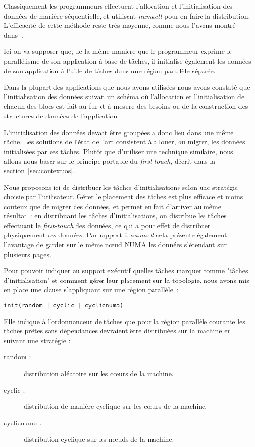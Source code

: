 Classiquement les programmeurs effectuent l'allocation et l'initialisation des données de manière séquentielle, et utilisent \emph{numactl} pour en faire la distribution. L'efficacité de cette méthode reste très moyenne, comme nous l'avons montré dans~\cite{Virouleau2016a}.

Ici on va supposer que, de la même manière que le programmeur exprime le parallélisme de son application à base de tâches, il initialise également les données de son application à l'aide de tâches dans une région parallèle séparée.

Dans la plupart des applications que nous avons utilisées nous avons constaté que l'initialisation des données suivait un schéma où l'allocation et l'initialisation de chacun des blocs est fait au fur et à mesure des besoins ou de la construction des structures de données de l'application.

L'initialisation des données devant être groupées a donc lieu dans une même tâche.
Les solutions de l'état de l'art consistent à allouer, ou migrer, les données initialisées par ces tâches.
Plutôt que d'utiliser une technique similaire, nous allons nous baser sur le principe portable du \emph{first-touch}, décrit dans la section~\ref{sec:context:os}.

Nous proposons ici de distribuer les tâches d'initialisations selon une stratégie choisie par l'utilisateur.
Gérer le placement des tâches est plus efficace et moins couteux que de migrer des données, et permet en fait d'arriver au même résultat~: en distribuant les tâches d'initialisations, on distribue les tâches effectuant le \emph{first-touch} des données, ce qui a pour effet de distribuer physiquement ces données.
Par rapport à \emph{numactl} cela présente également l'avantage de garder sur le même nœud NUMA les données s'étendant sur plusieurs pages.


Pour pouvoir indiquer au support exécutif quelles tâches marquer comme "tâches d'initialisation" et comment gérer leur placement sur la topologie, nous avons mis en place une clause s'appliquant sur une région parallèle~:

\begin{lstlisting}
init(random | cyclic | cyclicnuma)
\end{lstlisting}

Elle indique à l'ordonnanceur de tâches que pour la région parallèle courante les tâches prêtes sans dépendances devraient être distribuées sur la machine en suivant une stratégie :

\begin{description}
  \item [random :]
    distribution aléatoire sur les cœurs de la machine.
  \item [cyclic :]
    distribution de manière cyclique sur les cœurs de la machine.
  \item [cyclicnuma :]
    distribution cyclique sur les nœuds de la machine.
\end{description}


